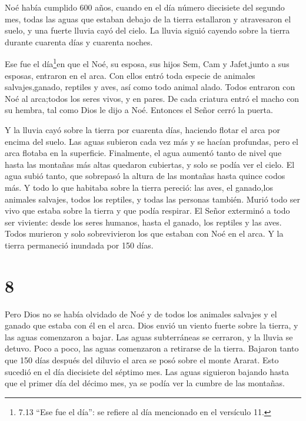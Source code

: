 Noé había cumplido 600 años, cuando en el día número
diecisiete del segundo mes, todas las aguas que estaban debajo de la
tierra estallaron y atravesaron el suelo, y una fuerte lluvia cayó del
cielo.  La lluvia siguió cayendo sobre la tierra durante
cuarenta días y cuarenta noches.

 Ese fue el día\footnote{7.13 ``Ese fue el día'': se
  refiere al día mencionado en el versículo 11.}en que el Noé, su
esposa, sus hijos Sem, Cam y Jafet,junto a sus esposas, entraron en el
arca.  Con ellos entró toda especie de animales
salvajes,ganado, reptiles y aves, así como todo animal alado.
 Todos entraron con Noé al arca;todos los seres vivos, y en
pares.  De cada criatura entró el macho con su hembra, tal
como Dios le dijo a Noé. Entonces el Señor cerró la puerta.

 Y la lluvia cayó sobre la tierra por cuarenta días,
haciendo flotar el arca por encima del suelo.  Las aguas
subieron cada vez más y se hacían profundas, pero el arca flotaba en la
superficie.  Finalmente, el agua aumentó tanto de nivel que
hasta las montañas más altas quedaron cubiertas, y solo se podía ver el
cielo.  El agua subió tanto, que sobrepasó la altura de las
montañas hasta quince codos más.  Y todo lo que habitaba
sobre la tierra pereció: las aves, el ganado,los animales salvajes,
todos los reptiles, y todas las personas también.  Murió
todo ser vivo que estaba sobre la tierra y que podía respirar.
 El Señor exterminó a todo ser viviente: desde los seres
humanos, hasta el ganado, los reptiles y las aves. Todos murieron y solo
sobrevivieron los que estaban con Noé en el arca.  Y la
tierra permaneció inundada por 150 días.

\hypertarget{section-7}{%
\section{8}\label{section-7}}

 Pero Dios no se había olvidado de Noé y de todos los
animales salvajes y el ganado que estaba con él en el arca. Dios envió
un viento fuerte sobre la tierra, y las aguas comenzaron a bajar.
 Las aguas subterráneas se cerraron, y la lluvia se detuvo.
 Poco a poco, las aguas comenzaron a retirarse de la tierra.
Bajaron tanto que 150 días después del diluvio  el arca se
posó sobre el monte Ararat. Esto sucedió en el día diecisiete del
séptimo mes.  Las aguas siguieron bajando hasta que el
primer día del décimo mes, ya se podía ver la cumbre de las montañas.

